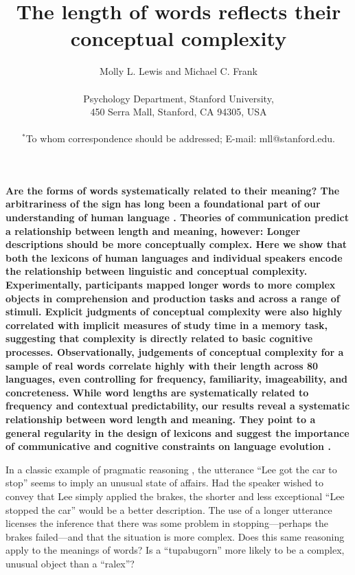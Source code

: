 \documentclass[12pt]{article}
\title{The length of words reflects their conceptual complexity}
\author
{Molly L. Lewis and Michael C. Frank\\
\\
\normalsize{Psychology Department, Stanford University,}\\
\normalsize{450 Serra Mall, Stanford, CA 94305, USA}\\
\\
\normalsize{$^\ast$To whom correspondence should be addressed; E-mail: mll@stanford.edu.}
}
\date{}
\newenvironment{sciabstract}{%
\begin{quote} \bf}
{\end{quote}}
\begin{document}
 

\baselineskip24pt

\maketitle 




{\bf Are the forms of words systematically related to their meaning? The arbitrariness of the sign has long been a foundational part of our understanding of human language \cite{saussure,hockett1960}. Theories of communication predict a relationship between length and meaning, however: Longer descriptions should be more conceptually complex.\cite{horn1984, levy2006} Here we show that both the lexicons of human languages and individual speakers encode the relationship between linguistic and conceptual complexity. Experimentally, participants mapped longer words to more complex objects in comprehension and production tasks and across a range of stimuli. Explicit judgments of conceptual complexity were also highly correlated with implicit measures of study time in a memory task, suggesting that complexity is directly related to basic cognitive processes. Observationally, judgements of conceptual complexity for a sample of real words correlate highly with their length across 80 languages, even controlling for frequency, familiarity, imageability, and concreteness. While word lengths are systematically related to frequency and contextual predictability,\cite{zipf1936,piantadosi2011a} our results reveal a systematic relationship between word length and meaning. They point to a general regularity in the design of lexicons and suggest the importance of communicative and cognitive constraints on language evolution \cite{christiansen2008,lieberman2007}.}




In a classic example of pragmatic reasoning \cite{horn1984}, the utterance ``Lee got the car to stop'' seems to imply an unusual state of affairs. Had the speaker wished to convey that Lee simply applied the brakes, the shorter and less exceptional ``Lee stopped the car'' would be a better description. The use of a longer utterance licenses the inference that there was some problem in stopping---perhaps the brakes failed---and that the situation is more complex. Does this same reasoning apply to the meanings of words? Is a ``tupabugorn'' more likely to be a complex, unusual object than a ``ralex''? 
\end{document}
